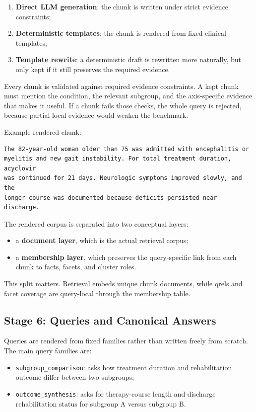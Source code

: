 \documentclass[11pt,a4paper]{article}
\newcommand{\field}[1]{\texttt{#1}}
\newcommand{\stage}[2]{\subsection{\textcolor{betterblue}{#1}: #2}}
\begin{document}
\begin{enumerate}[noitemsep, topsep=0pt]
	\item \textbf{Direct LLM generation}: the chunk is written under strict evidence constraints;
	\item \textbf{Deterministic templates}: the chunk is rendered from fixed clinical templates;
	\item \textbf{Template rewrite}: a deterministic draft is rewritten more naturally, but only kept if it still preserves the required evidence.
\end{enumerate}

Every chunk is validated against required evidence constraints. A kept chunk must mention the condition, the relevant subgroup, and the axis-specific evidence that makes it useful. If a chunk fails those checks, the whole query is rejected, because partial local evidence would weaken the benchmark.

Example rendered chunk:

\begin{lstlisting}[style=promptstyle]
The 82-year-old woman older than 75 was admitted with encephalitis or
myelitis and new gait instability. For total treatment duration, acyclovir
was continued for 21 days. Neurologic symptoms improved slowly, and the
longer course was documented because deficits persisted near discharge.
\end{lstlisting}

The rendered corpus is separated into two conceptual layers:

\begin{itemize}[noitemsep, topsep=0pt]
	\item a \textbf{document layer}, which is the actual retrieval corpus;
	\item a \textbf{membership layer}, which preserves the query-specific link from each chunk to facts, facets, and cluster roles.
\end{itemize}

This split matters. Retrieval embeds unique chunk documents, while qrels and facet coverage are query-local through the membership table.

\stage{Stage 6}{Queries and Canonical Answers}

Queries are rendered from fixed families rather than written freely from scratch. The main query families are:

\begin{itemize}[noitemsep, topsep=0pt]
	\item \field{subgroup\_comparison}: asks how treatment duration and rehabilitation outcome differ between two subgroups;
	\item \field{outcome\_synthesis}: asks for therapy-course length and discharge rehabilitation status for subgroup A versus subgroup B.
\end{itemize}
\end{document}

